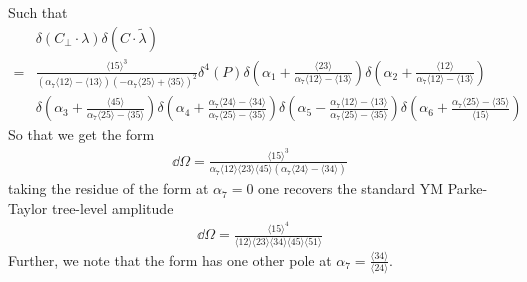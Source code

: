 \documentclass[letter,11pt]{article}
\newcommand{\ab}[1]{\langle #1 \rangle}
\begin{document}
Such that
\begin{equation}
	\begin{aligned}
		&\delta(C_\perp\cdot \lambda)\delta(C\cdot\tilde \lambda)\\
		=&
		\frac{\ab{15}^3}{\left(\alpha_7\ab{12}-\ab{13}\right)
	\left(-\alpha_7\ab{25}+\ab{35}\right)^2	
	}\delta^4( P)
		\delta\left(\alpha_1+\frac{\ab{23}}{\alpha_7\ab{12}-\ab{13}}\right)
		\delta\left(\alpha_2+\frac{\ab{12}}{\alpha_7\ab{12}-\ab{13}}\right)\\&
		\delta\left(\alpha_3+\frac{\ab{45}}{\alpha_7\ab{25}-\ab{35}}\right)
		\delta\left(\alpha_4+\frac{\alpha_7\ab{24}-\ab{34}}{\alpha_7\ab{25}-\ab{35}}\right)
		\delta\left(\alpha_5-\frac{\alpha_7\ab{12}-\ab{13}}{\alpha_7\ab{25}-\ab{35}}\right)
		\delta\left(\alpha_6+\frac{\alpha_7\ab{25}-\ab{35}}{\ab{15}}\right)
	\end{aligned}
\end{equation}
So that we get the form
\begin{equation}
	\begin{aligned}
	\dd \Omega=	\frac{\ab{15}^3}{\alpha_7 \ab{12}\ab{23}\ab{45}\left(\alpha_7\ab{24}-\ab{34}\right)}
	\end{aligned}
\end{equation}
taking the residue of the form at $\alpha_7=0$ one recovers the standard YM Parke-Taylor tree-level amplitude
\begin{equation}
	\begin{aligned}
		\dd \Omega=	\frac{\ab{15}^4}{ \ab{12}\ab{23}\ab{34}\ab{45}\ab{51}}
	\end{aligned}
\end{equation}
Further, we note that the form has one other pole at $\alpha_7=\frac{\ab{34}}{\ab{24}}$.
\end{document}
